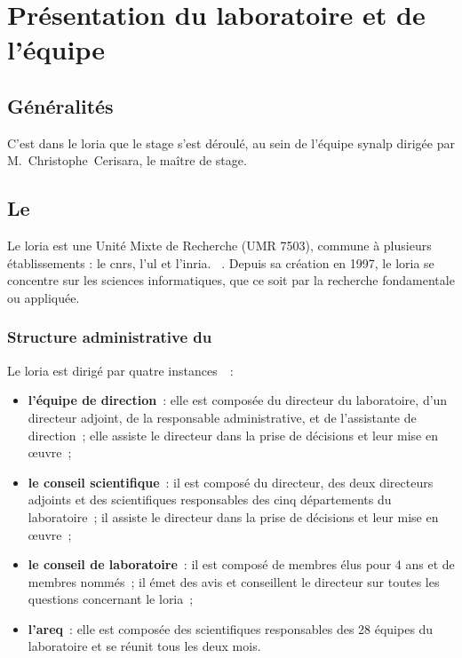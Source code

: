 \chapter{Présentation du laboratoire et de l'équipe}
\section{Généralités}
C'est dans le \gls{loria} que le stage s'est déroulé, au sein de l'équipe \gls{synalp} dirigée par M.~Christophe~Cerisara, le maître de stage.

\section{Le }
Le \gls{loria} \og est une Unité Mixte de Recherche (UMR 7503), commune à plusieurs établissements : le \gls{cnrs}, l’\gls{ul} et l'\gls{inria}. \fg{}~\autocite{about_loria}.
Depuis sa création en 1997, le \gls{loria} se concentre sur les sciences informatiques, que ce soit par la recherche fondamentale ou appliquée.

\subsection{Structure administrative du }
Le \gls{loria} est dirigé par quatre instances~\autocite{organisation_loria}~:
\begin{itemize}
	\item \textbf{l'équipe de direction}~: elle est composée du directeur du laboratoire, d'un directeur adjoint, de la responsable administrative, et de l'assistante de direction~; elle assiste le directeur dans la prise de décisions et leur mise en œuvre~;
	\item \textbf{le conseil scientifique}~: il est composé du directeur, des deux directeurs adjoints et des scientifiques responsables des cinq départements du laboratoire~; il assiste le directeur dans la prise de décisions et leur mise en œuvre~;
	\item \textbf{le conseil de laboratoire}~: il est composé de membres élus pour 4 ans et de membres nommés~; il émet des avis et conseillent le directeur sur toutes les questions concernant le \gls{loria}~;
	\item \textbf{l'\gls{areq}}~: elle est composée des scientifiques responsables des 28 équipes du laboratoire et se réunit tous les deux mois.
\end{itemize}
\vspace{1em}

